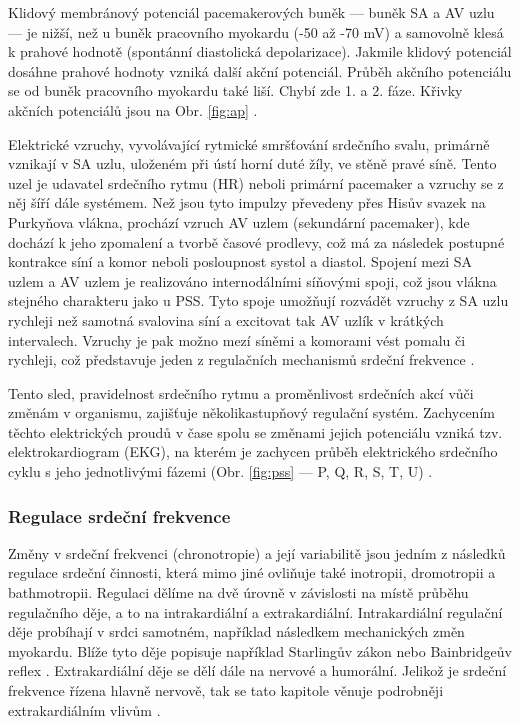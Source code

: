 Klidový membránový potenciál pacemakerových buněk --- buněk SA a AV uzlu --- je
nižší, než u buněk pracovního myokardu (-50 až -70 mV) a samovolně klesá k
prahové hodnotě (spontánní diastolická depolarizace). Jakmile klidový potenciál
dosáhne prahové hodnoty vzniká další akční potenciál. Průběh akčního potenciálu
se od buněk pracovního myokardu také liší. Chybí zde 1. a 2. fáze. Křivky
akčních potenciálů jsou na Obr. \ref{fig:ap} \cite{Petrek2019}.

Elektrické vzruchy, vyvolávající rytmické smršťování srdečního svalu, primárně
vznikají v SA uzlu, uloženém při ústí horní duté žíly, ve stěně pravé síně.
Tento uzel je udavatel srdečního rytmu (HR) neboli primární pacemaker a vzruchy se z
něj šíří dále systémem. Než jsou tyto impulzy převedeny přes Hisův svazek na
Purkyňova vlákna, prochází vzruch AV uzlem (sekundární pacemaker), kde dochází k
jeho zpomalení a tvorbě časové prodlevy, což má za následek postupné kontrakce
síní a komor neboli posloupnost systol a diastol. Spojení mezi SA uzlem a AV
uzlem je realizováno internodálními síňovými spoji, což jsou vlákna stejného
charakteru jako u PSS. Tyto spoje umožňují rozvádět vzruchy z SA uzlu rychleji
než samotná svalovina síní a excitovat tak AV uzlík v krátkých intervalech.
Vzruchy je pak možno mezí síněmi a komorami vést pomalu či rychleji, což
představuje jeden z regulačních mechanismů srdeční frekvence
\cite{Dylevsky2013,Cihak2016}.

Tento sled, pravidelnost srdečního rytmu a proměnlivost srdečních akcí vůči
změnám v organismu, zajišťuje několikastupňový regulační systém. Zachycením
těchto elektrických proudů v čase spolu se změnami jejich potenciálu vzniká tzv.
elektrokardiogram (EKG), na kterém je zachycen průběh elektrického srdečního
cyklu s jeho jednotlivými fázemi (Obr. \ref{fig:pss} --- P, Q, R, S, T, U)
\cite{Dylevsky2013,Cihak2016}.


\subsubsection{Regulace srdeční frekvence}
\label{section:hr_regulation}
Změny v srdeční frekvenci (chronotropie) a její variabilitě jsou jedním z
následků regulace srdeční činnosti, která mimo jiné ovliňuje také inotropii,
dromotropii a bathmotropii. Regulaci dělíme na dvě úrovně v závislosti na místě
průběhu regulačního děje, a to na intrakardiální a extrakardiální.
Intrakardiální regulační děje probíhají v srdci samotném, například následkem
mechanických změn myokardu. Blíže tyto děje popisuje například Starlingův zákon
nebo Bainbridgeův reflex \cite{Kittnar2020}. Extrakardiální děje se dělí dále na
nervové a humorální. Jelikož je srdeční frekvence řízena hlavně nervově, tak se
tato kapitole věnuje podrobněji extrakardiálním vlivům \cite{Orel2019}.

